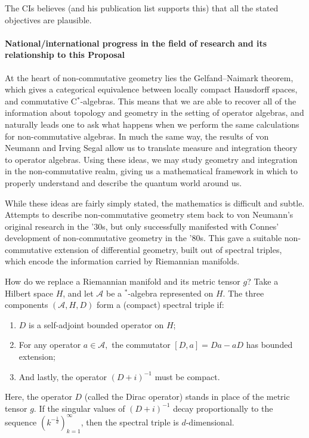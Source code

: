 \documentclass[12pt]{article}
\begin{document}
{\color{red} The CIs believes (and his publication list supports this)
that all the stated objectives are plausible.}


\paragraph*{National/international progress in the field of research and its relationship to this Proposal}

At the heart of non-commutative geometry lies the Gelfand--Naimark theorem,
which gives a categorical equivalence between locally compact Hausdorff spaces,
and commutative C$^{\ast}$-algebras. This means that we are able to recover all of the information about topology and geometry in the setting of operator algebras, and naturally leads one to ask what happens when we perform the same calculations for non-commutative algebras. In much the same way, the results of von Neumann and Irving Segal allow us to translate measure and integration theory to operator algebras.
Using these ideas, we may study geometry and integration in the non-commutative realm, giving us a mathematical framework in which to properly understand and describe the quantum world around us.

While these ideas are fairly simply stated, the mathematics is difficult and
subtle. Attempts to describe non-commutative geometry stem back to von Neumann's
original research in the '30s, but only successfully manifested with Connes'
development of non-commutative geometry in the '80s. This gave a suitable non-commutative extension of differential geometry, built out of spectral triples, which encode the information carried by Riemannian manifolds.

How do we replace a Riemannian manifold and its metric tensor $g$? Take a Hilbert space $H$, and let $\mathcal{A}$ be a $^{\ast}$-algebra represented on $H.$ The three components $(\mathcal{A},H,D)$ form a (compact) spectral triple if:
\begin{enumerate}
\item $D$ is a self-adjoint bounded operator on $H$;
\item For any operator $a\in\mathcal{A},$ the commutator $[D,a]=Da-aD$ has bounded extension;
\item And lastly, the operator $(D+i)^{-1}$ must be compact.
\end{enumerate}
Here, the operator $D$ (called the Dirac operator) stands in place of the metric
tensor $g.$ If the singular values of $(D+i)^{-1}$ decay proportionally to the sequence $(k^{-\frac{1}{d}})_{k=1}^{\infty}$, then the spectral triple is $d$-dimensional.
\end{document}
